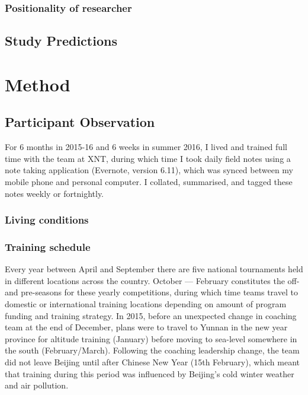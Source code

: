 \subsubsection{Positionality of researcher}




\subsection{Study Predictions}




\section{Method}
  \subsection{Participant Observation}

  For 6 months in 2015-16 and 6 weeks in summer 2016, I lived and trained full time with the team at XNT, during which time I took daily field notes using a note taking application (Evernote, version 6.11), which was synced between my mobile phone and personal computer. I collated, summarised, and tagged these notes weekly or fortnightly.

    \subsubsection{Living conditions}



    \subsubsection{Training schedule}
    Every year between April and September there are five national tournaments held in different locations across the country.  October –-- February constitutes the off- and pre-seasons for these yearly competitions, during which time teams travel to domestic or international training locations depending on amount of program funding and training strategy.  In 2015, before an unexpected change in coaching team at the end of December, plans were to travel to Yunnan in the new year province for altitude training (January) before moving to sea-level somewhere in the south (February/March).  Following the coaching leadership change, the team did not leave Beijing until after Chinese New Year (15th February), which meant that training during this period was influenced by Beijing's cold winter weather and air pollution.

